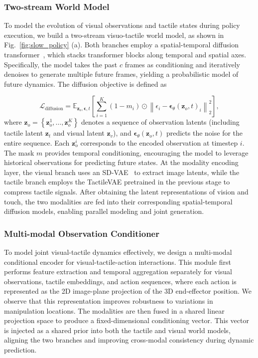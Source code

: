 \subsubsection{Two-stream World Model}
To model the evolution of visual observations and tactile states during policy execution, we build a two-stream visuo-tactile world model, as shown in Fig.~\ref{fig:slow_policy} (a). Both branches employ a spatial-temporal diffusion transformer~\cite{peebles2023scalable}, which stacks transformer blocks along temporal and spatial axes. Specifically, the model takes the past $c$ frames as conditioning and iteratively denoises to generate multiple future frames, yielding a probabilistic model of future dynamics. The diffusion objective is defined as

\vspace{-2mm}
\begin{equation}
\mathcal{L}_{\text{diffusion}}=\mathbb{E}_{\mathbf{z}_o, \boldsymbol{\epsilon}, t}\left[\sum_{i=1}^K \left(1-m_i\right) \odot \left\|\epsilon_i-\boldsymbol{\epsilon}_\theta\left(\mathbf{z}_o, t\right)_i\right\|_2^2\right],
\end{equation}
where $\mathbf{z}_o = \left\{ \mathbf{z}_o^{1}, \dots, \mathbf{z}_o^{K} \right\}$ denotes a sequence of observation latents (including tactile latent $\mathbf{z}_t$ and visual latent $\mathbf{z}_v$), and $\boldsymbol{\epsilon}_\theta(\mathbf{z}_o, t)$ predicts the noise for the entire sequence. Each $\mathbf{z}_o^{i}$ corresponds to the encoded observation at timestep $i$. The mask $m$ provides temporal conditioning, encouraging the model to leverage historical observations for predicting future states.
At the modality encoding layer, the visual branch uses an SD-VAE~\cite{rombach2022high} to extract image latents, while the tactile branch employs the TactileVAE pretrained in the previous stage to compress tactile signals. After obtaining the latent representations of vision and touch, the two modalities are fed into their corresponding spatial-temporal diffusion models, enabling parallel modeling and joint generation. 

\subsubsection{Multi-modal Observation Conditioner}
To model joint visual-tactile dynamics effectively, we design a multi-modal conditional encoder for visual-tactile-action interactions. This module first performs feature extraction and temporal aggregation separately for visual observations, tactile embeddings, and action sequences, where each action is represented as the 2D image-plane projection of the 3D end-effector position. We observe that this representation improves robustness to variations in manipulation locations. The modalities are then fused in a shared linear projection space to produce a fixed-dimensional conditioning vector. This vector is injected as a shared prior into both the tactile and visual world models, aligning the two branches and improving cross-modal consistency during dynamic prediction.

